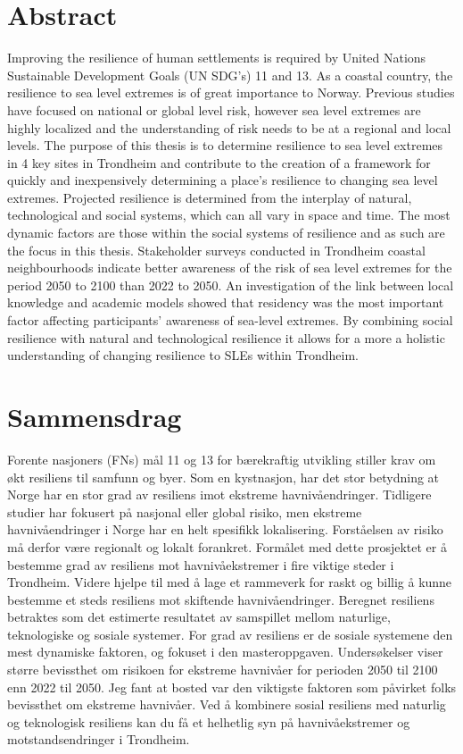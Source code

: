 


\section{Abstract}

Improving the resilience of human settlements is required by United Nations Sustainable Development Goals (UN SDG's) 11 and 13. As a coastal country, the resilience to sea level extremes is of great importance to Norway. Previous studies have focused on national or global level risk, however sea level extremes are highly localized  and the understanding of risk needs to be at a regional and local levels. The purpose of this thesis is to determine resilience to sea level extremes in 4 key sites in Trondheim and contribute to the creation of a framework for quickly and inexpensively determining a place's resilience to changing sea level extremes. Projected resilience is determined from the interplay of natural, technological and social systems, which can all vary in space and time. The most dynamic factors are those within the social systems of resilience and as such are the focus in this thesis. Stakeholder surveys conducted in Trondheim coastal neighbourhoods indicate better awareness of the risk of sea level extremes for the period 2050 to 2100 than 2022 to 2050. An  investigation of the link between local knowledge and academic models showed that residency was the most important factor affecting participants' awareness of sea-level extremes.  By combining social resilience with natural and technological resilience it allows for a more a holistic understanding of changing resilience to SLEs within Trondheim.
   

\newpage

\section{Sammensdrag}
Forente nasjoners (FNs) mål 11 og 13 for bærekraftig utvikling stiller krav om økt resiliens til samfunn og byer. Som en kystnasjon, har det stor betydning at Norge har en stor grad av resiliens imot ekstreme havnivåendringer. Tidligere studier har fokusert på nasjonal eller global risiko, men ekstreme havnivåendringer i Norge har en helt spesifikk lokalisering. Forståelsen av risiko må derfor være regionalt og lokalt forankret. Formålet med dette prosjektet er å bestemme grad av resiliens mot havnivåekstremer i fire viktige steder i Trondheim. Videre hjelpe til med å lage et rammeverk for raskt og billig å kunne bestemme et steds resiliens mot skiftende havnivåendringer. Beregnet resiliens betraktes som det estimerte resultatet av samspillet mellom naturlige, teknologiske og sosiale systemer. For grad av resiliens er de sosiale systemene den mest dynamiske faktoren, og fokuset i den masteroppgaven. Undersøkelser viser større bevissthet om risikoen for ekstreme havnivåer for perioden 2050 til 2100 enn 2022 til 2050. Jeg fant at bosted var den viktigste faktoren som påvirket folks bevissthet om ekstreme havnivåer. Ved å kombinere sosial resiliens med naturlig og teknologisk resiliens kan du få et helhetlig syn på havnivåekstremer og motstandsendringer i Trondheim.